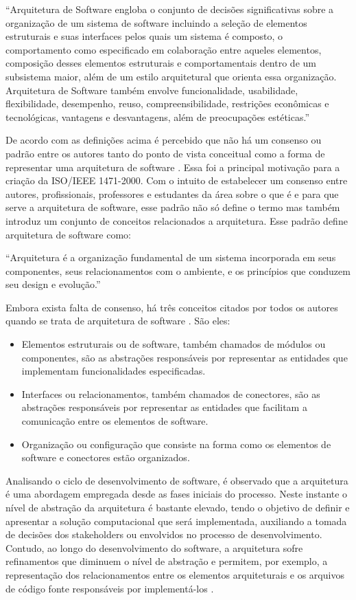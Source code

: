  “Arquitetura de Software engloba o conjunto de decisões significativas sobre a organização de um sistema de software incluindo a seleção de elementos estruturais e suas interfaces pelos quais um sistema é composto, o comportamento como especificado em colaboração entre aqueles elementos, composição desses elementos estruturais e comportamentais dentro de um subsistema maior, além de um estilo arquitetural que orienta essa organização. Arquitetura de Software também envolve funcionalidade, usabilidade, flexibilidade, desempenho, reuso, compreensibilidade, restrições econômicas e tecnológicas, vantagens e desvantagens, além de preocupações estéticas.”

De acordo com as definições acima é percebido que não há um consenso ou padrão entre os autores tanto do ponto de vista conceitual como a forma de representar uma arquitetura de software \cite{buschmann2007pattern}.  Essa foi a principal motivação para a criação da ISO/IEEE 1471-2000. Com o intuito de estabelecer um consenso entre autores, profissionais, professores e estudantes da área sobre o que é e para que serve a arquitetura de software, esse padrão não só define o termo mas também introduz um conjunto de conceitos relacionados a arquitetura. Esse padrão define arquitetura de software como: 

“Arquitetura é a organização fundamental de um sistema incorporada em seus componentes, seus relacionamentos com o ambiente, e os princípios que conduzem seu design e evolução.”

Embora exista falta de consenso, há três conceitos citados por todos os autores quando se trata de arquitetura de software \cite{dias2000software}. São eles:

\begin{itemize}
\item Elementos estruturais ou de software, também chamados de módulos ou componentes, são as abstrações responsáveis por representar as entidades que implementam funcionalidades especificadas.
\item Interfaces ou relacionamentos, também chamados de conectores, são as abstrações responsáveis por representar as entidades que facilitam a comunicação entre os elementos de software.
\item Organização ou configuração que consiste na forma como os elementos de software e conectores estão organizados.
\end{itemize}

Analisando o ciclo de desenvolvimento de software, é observado que a arquitetura é uma abordagem empregada desde as fases iniciais do processo. Neste instante o nível de abstração da arquitetura é bastante elevado, tendo o objetivo de definir e apresentar a solução computacional que será implementada, auxiliando a tomada de decisões dos stakeholders ou envolvidos no processo de desenvolvimento. Contudo, ao longo do desenvolvimento do software, a arquitetura sofre refinamentos que diminuem o nível de abstração e permitem, por exemplo, a representação dos relacionamentos entre os elementos arquiteturais e os arquivos de código fonte responsáveis por implementá-los \cite{clements2002documenting}.

